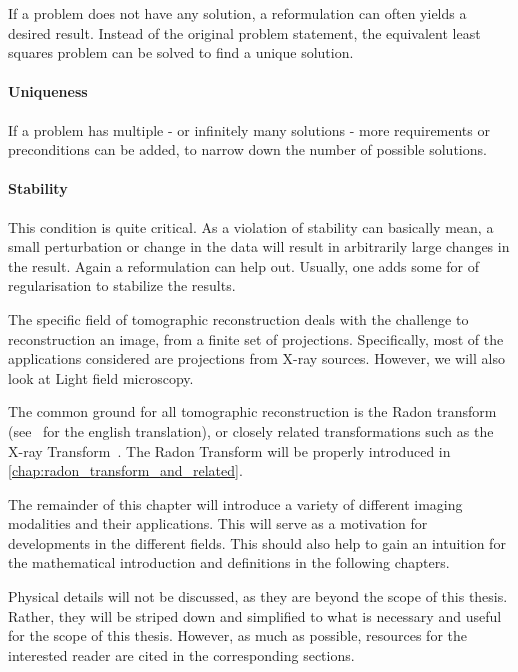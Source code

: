If a problem does not have any solution, a reformulation can often yields a desired result. Instead
of the original problem statement, the equivalent least squares problem can be solved to find a
unique solution. 

\paragraph{Uniqueness}

If a problem has multiple - or infinitely many solutions - more requirements or preconditions can be
added, to narrow down the number of possible solutions. 

\paragraph{Stability}

This condition is quite critical. As a violation of stability can basically mean, a small
perturbation or change in the data will result in arbitrarily large changes in the result. Again a
reformulation can help out. Usually, one adds some for of regularisation to stabilize the results.

The specific field of tomographic reconstruction deals with the challenge to reconstruction an
image, from a finite set of projections. Specifically, most of the applications considered are
projections from X-ray sources. However, we will also look at Light field microscopy.

The common ground for all tomographic reconstruction is the Radon transform~\cite{radon_uber_1917}
(see~\cite{radon_determination_1986} for the english translation), or closely related
transformations such as the X-ray Transform~\cite{solmon_x-ray_1976}. The Radon Transform will be
properly introduced in \autoref{chap:radon_transform_and_related}.

The remainder of this chapter will introduce a variety of different imaging modalities and their
applications. This will serve as a motivation for developments in the different fields. This should
also help to gain an intuition for the mathematical introduction and definitions in the following
chapters.

Physical details will not be discussed, as they are beyond the scope of this thesis. Rather, they
will be striped down and simplified to what is necessary and useful for the scope of this thesis.
However, as much as possible, resources for the interested reader are cited in the corresponding
sections.


